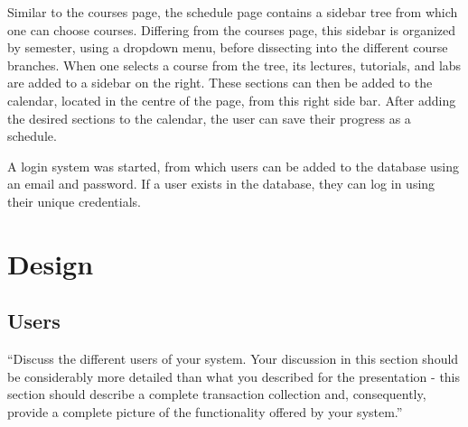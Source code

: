\documentclass[twoside=false,a4paper,11pt]{article}
\theoremstyle{mytheor}
\begin{document}
Similar to the courses page, the schedule page contains a sidebar tree from which one can choose courses. Differing from the courses page, this sidebar is organized by semester, using a dropdown menu, before dissecting into the different course branches. When one selects a course from the tree, its lectures, tutorials, and labs are added to a sidebar on the right. These sections can then be added to the calendar, located in the centre of the page, from this right side bar. After adding the desired sections to the calendar, the user can save their progress as a schedule.

A login system was started, from which users can be added to the database using an email and password. If a user exists in the database, they can log in using their unique credentials.

\section*{Design}

\subsection*{Users}

``Discuss the different users of your system. Your discussion in this section should be considerably more detailed than what you described for the presentation - this section should describe a complete transaction collection and, consequently, provide a complete picture of the functionality offered by your system.''
\end{document}
